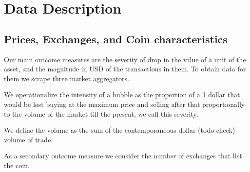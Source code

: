 \section{Data Description}

\subsection{Prices, Exchanges, and Coin characteristics}



Our main outcome measures are the severity of drop in the value of a unit of the asset, and the magnitude in USD of the transactions in them.
To obtain data for them we scrape three market aggregators. 

We operationalize the intensity of a bubble as the proportion of a 1 dollar that would be lost buying at the maximum price and selling after that proportionally to the volume of the market till the present, we call this severity.

We define the volume as the sum of the contemporaneous dollar (todo check) volume of trade.

As a secondary outcome measure we consider the number of exchanges that list the coin.
